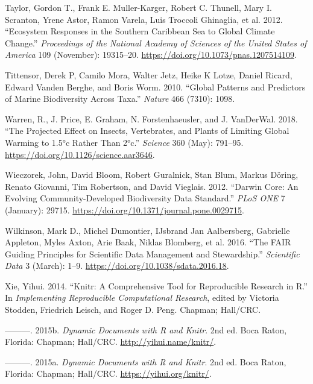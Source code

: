 \documentclass[
]{book}
\newlength{\cslhangindent}
\newlength{\cslentryspacingunit} %
\newenvironment{CSLReferences}[2] %
 {%
  \setlength{\parindent}{0pt}
  \ifodd #1
  \let\oldpar\par
  \def\par{\hangindent=\cslhangindent\oldpar}
  \fi
  \setlength{\parskip}{#2\cslentryspacingunit}
 }%
 {}
\begin{document}
\begin{CSLReferences}{1}{0}
\leavevmode{}%
Taylor, Gordon T., Frank E. Muller-Karger, Robert C. Thunell, Mary I. Scranton, Yrene Astor, Ramon Varela, Luis Troccoli Ghinaglia, et al. 2012. {``Ecosystem Responses in the Southern Caribbean Sea to Global Climate Change.''} \emph{Proceedings of the National Academy of Sciences of the United States of America} 109 (November): 19315--20. \url{https://doi.org/10.1073/pnas.1207514109}.

\leavevmode{}%
Tittensor, Derek P, Camilo Mora, Walter Jetz, Heike K Lotze, Daniel Ricard, Edward Vanden Berghe, and Boris Worm. 2010. {``Global Patterns and Predictors of Marine Biodiversity Across Taxa.''} \emph{Nature} 466 (7310): 1098.

\leavevmode{}%
Warren, R., J. Price, E. Graham, N. Forstenhaeusler, and J. VanDerWal. 2018. {``The Projected Effect on Insects, Vertebrates, and Plants of Limiting Global Warming to 1.5°c Rather Than 2°c.''} \emph{Science} 360 (May): 791--95. \url{https://doi.org/10.1126/science.aar3646}.

\leavevmode{}%
Wieczorek, John, David Bloom, Robert Guralnick, Stan Blum, Markus Döring, Renato Giovanni, Tim Robertson, and David Vieglais. 2012. {``Darwin Core: An Evolving Community-Developed Biodiversity Data Standard.''} \emph{PLoS ONE} 7 (January): 29715. \url{https://doi.org/10.1371/journal.pone.0029715}.

\leavevmode{}%
Wilkinson, Mark D., Michel Dumontier, IJsbrand Jan Aalbersberg, Gabrielle Appleton, Myles Axton, Arie Baak, Niklas Blomberg, et al. 2016. {``The FAIR Guiding Principles for Scientific Data Management and Stewardship.''} \emph{Scientific Data} 3 (March): 1--9. \url{https://doi.org/10.1038/sdata.2016.18}.

\leavevmode{}%
Xie, Yihui. 2014. {``Knitr: A Comprehensive Tool for Reproducible Research in {R}.''} In \emph{Implementing Reproducible Computational Research}, edited by Victoria Stodden, Friedrich Leisch, and Roger D. Peng. Chapman; Hall/CRC.

\leavevmode{}%
---------. 2015b. \emph{Dynamic Documents with {R} and Knitr}. 2nd ed. Boca Raton, Florida: Chapman; Hall/CRC. \url{http://yihui.name/knitr/}.

\leavevmode{}%
---------. 2015a. \emph{Dynamic Documents with {R} and Knitr}. 2nd ed. Boca Raton, Florida: Chapman; Hall/CRC. \url{https://yihui.org/knitr/}.


\end{CSLReferences}
\end{document}
